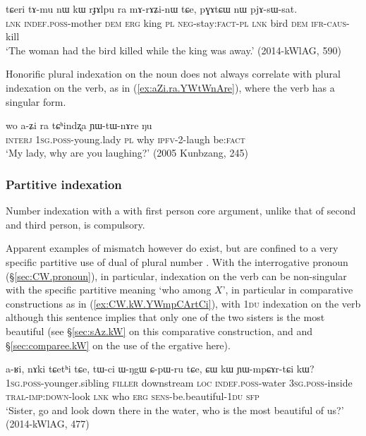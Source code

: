 \begin{exe}
\ex \label{ex:rJAlpu.mArAZinW}
\gll  tɕeri tɤ-mu nɯ kɯ rɟɤlpu ra mɤ-rɤʑi-nɯ tɕe, pɣɤtɕɯ nɯ pjɤ-sɯ-sat. \\
\textsc{lnk} \textsc{indef}.\textsc{poss}-mother \textsc{dem} \textsc{erg} king \textsc{pl} \textsc{neg}-stay:\textsc{fact}-\textsc{pl} \textsc{lnk} bird \textsc{dem} \textsc{ifr}-\textsc{caus}-kill \\
\glt `The woman had the bird killed while the king was away.' (2014-kWlAG, 590)
\end{exe}

Honorific plural indexation on the noun does not always correlate with plural indexation on the verb, as in (\ref{ex:aZi.ra.YWtWnAre}), where the verb has a singular form.

\begin{exe}
\ex \label{ex:aZi.ra.YWtWnAre}
\gll wo a-ʑi ra tɕʰindʐa ɲɯ-tɯ-nɤre ŋu \\
\textsc{interj} \textsc{1sg}.\textsc{poss}-young.lady \textsc{pl} why \textsc{ipfv}-2-laugh be:\textsc{fact} \\
\glt `My lady, why are you laughing?' (2005 Kunbzang, 245)
\end{exe}



\subsubsection{Partitive indexation} \label{sec:partitive.indexation}
Number indexation with a with first person core argument, unlike that of second and third person, is compulsory. 

Apparent examples of mismatch however do exist, but are confined to a very specific partitive use of dual of plural number \citep{bickel00agreement}. With the interrogative pronoun  (§\ref{sec:CW.pronoun}), in particular, indexation on the verb can be non-singular with the specific partitive meaning `who among $X$', in particular in comparative constructions as in (\ref{ex:CW.kW.YWmpCArtCi}), with \textsc{1du} indexation on the verb although this sentence implies that only one of the two sisters is the most beautiful (see §\ref{sec:sAz.kW} on this comparative construction, and \citet{jacques16comparative} and §\ref{sec:comparee.kW} on the use of the ergative here).

\begin{exe}
\ex   \label{ex:CW.kW.YWmpCArtCi}
 \gll  a-ʁi, nɤki tɕetʰi tɕe, tɯ-ci ɯ-ŋgɯ ɕ-pɯ-ru tɕe, ɕɯ kɯ ɲɯ-mpɕɤr-tɕi kɯ? \\
 \textsc{1sg}.\textsc{poss}-younger.sibling \textsc{filler} downstream \textsc{loc} \textsc{indef}.\textsc{poss}-water \textsc{3sg}.\textsc{poss}-inside \textsc{tral}-\textsc{imp}:\textsc{down}-look \textsc{lnk} who \textsc{erg} \textsc{sens}-be.beautiful-\textsc{1du} \textsc{sfp} \\
 \glt `Sister, go and look down there in the water, who is the most beautiful of us?' (2014-kWlAG, 477)
\end{exe} 

